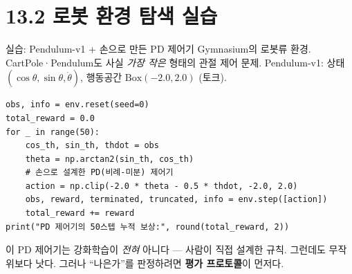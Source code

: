 \section{13.2 로봇 환경 탐색 실습}
\begin{frame}[fragile]{실습: Pendulum-v1 + 손으로 만든 PD 제어기}
  Gymnasium의 로봇류 환경. CartPole·Pendulum도 사실 \emph{가장 작은}
  형태의 관절 제어 문제. Pendulum-v1: 상태 $(\cos\theta, \sin\theta, \dot\theta)$,
   행동공간 $\text{Box}(-2.0, 2.0)$ (토크).
\begin{lstlisting}
obs, info = env.reset(seed=0)
total_reward = 0.0
for _ in range(50):
    cos_th, sin_th, thdot = obs
    theta = np.arctan2(sin_th, cos_th)
    # 손으로 설계한 PD(비례-미분) 제어기
    action = np.clip(-2.0 * theta - 0.5 * thdot, -2.0, 2.0)
    obs, reward, terminated, truncated, info = env.step([action])
    total_reward += reward
print("PD 제어기의 50스텝 누적 보상:", round(total_reward, 2))
\end{lstlisting}
  {\footnotesize 이 PD 제어기는 강화학습이 \emph{전혀} 아니다 --- 사람이 직접
  설계한 규칙. 그런데도 무작위보다 낫다. 그러나 ``나은가''를 판정하려면
  \textbf{평가 프로토콜}이 먼저다.}
\end{frame}
